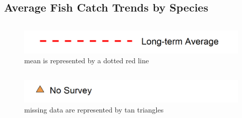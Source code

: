 \documentclass[
]{book}
\begin{document}
\hypertarget{average-fish-catch-trends-by-species}{%
\subsection{Average Fish Catch Trends by Species}\label{average-fish-catch-trends-by-species}}

\begin{columns-nocenter}

\begin{column}

\begin{figure}
\includegraphics[width=15.25in]{figures/mline} \caption{mean is represented by a dotted red line}\label{fig:unnamed-chunk-119}
\end{figure}

\end{column}

\begin{column}

\begin{figure}
\includegraphics[width=15.25in]{figures/mpoint} \caption{missing data are represented by tan triangles}\label{fig:unnamed-chunk-120}
\end{figure}

\end{column}

\begin{column}

\end{column}

\end{columns-nocenter}
\end{document}
